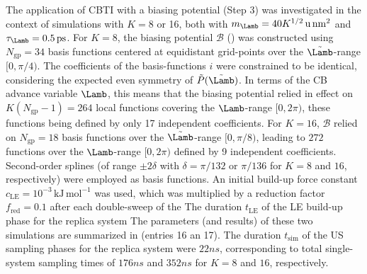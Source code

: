 The application of CBTI with a biasing potential (Step 3)
was investigated in the context of simulations with $K=8$ or 16, 
both with $m_{\Lamb}=40 K^{1/2}\,\mathrm{u}\,\mathrm{nm}^2$ and  $\tau_{\Lamb}=0.5\,\mathrm{ps}$.
%
For $K=8$, the biasing potential $\mathcal{B}$ () was constructed 
using $N_{\mathrm{gp}}=34$ basis functions centered at equidistant grid-points 
over the $\tilde{\Lamb}$-range $[0,\pi/4)$. 
%
The coefficients of the basis-functions $i$ 
were constrained to be identical, 
considering the expected even symmetry of $\tilde{P}(\tilde{\Lamb})$.
%
In terms of the CB advance variable $\Lamb$, this means that the biasing potential relied in effect on $K(N_{\mathrm{gp}}-1)=264$ local functions covering the $\Lamb$-range $[0,2\pi)$, these functions being defined by only 17 independent coefficients. 
For $K=16$, $\mathcal{B}$ 
relied on $N_{\mathrm{gp}}=18$ basis functions 
over the $\tilde{\Lamb}$-range $[0,\pi/8)$, leading to $272$ functions over the $\Lamb$-range $[0,2\pi)$ 
defined by 9 independent coefficients.
%
Second-order splines\cite{DE01.6,HA07.12} (of range $\pm 2 \delta$ with $\delta=\pi/132$ or $\pi/136$ for $K=8$ and $16$, respectively) were 
employed\cite{BI14.1} as basis functions. An initial build-up 
force constant $c_{\mathrm{LE}}=10^{-3}\,\mathrm{kJ\,mol^{-1}}$ was used, which was multiplied by a reduction factor $f_{\mathrm{red}}=0.1$ 
after each double-sweep of  the 
% 
The duration $t_{\mathrm{LE}}$ of the LE build-up phase for 
the replica system 
%
The parameters (and results) of these two simulations are summarized in  (entries 16 an 17).
%
The duration $t_{\mathrm{sim}}$ of the US sampling phases for 
the replica system were $22\unit{ns}$,
corresponding to total single-system sampling 
times of $176\unit{ns}$ and $352\unit{ns}$ for $K=8$ and $16$, respectively. 
%


